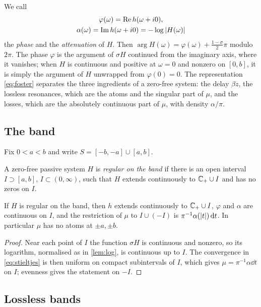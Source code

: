 We call
\begin{gather*}
\varphi(\omega)=\operatorname{Re} h(\omega+i0),\\
\alpha(\omega)=\operatorname{Im} h(\omega+i0)=-\log\left|H(\omega)\right|
\end{gather*}
the \emph{phase} and the \emph{attenuation} of $H$. Then $\arg H(\omega)
=\varphi(\omega)+\frac{1-\sigma}2\pi$ modulo $2\pi$. The phase $\varphi$ is the
argument of $\sigma H$ continued from the imaginary axis, where it vanishes;
when $H$ is continuous and positive at $\omega=0$ and nonzero on $[0,b]$, it
is simply the argument of $H$ unwrapped from $\varphi(0)=0$. The
representation \eqref{eq:foster} separates the three ingredients of a
zero-free system: the delay $\beta z$, the lossless resonances, which are the
atoms and the singular part of $\mu$, and the losses, which are the
absolutely continuous part of $\mu$, with density $\alpha/\pi$.

\subsection{The band}

Fix $0<a<b$ and write $S=[-b,-a]\cup[a,b]$.

\begin{definition}\label{def:band}
A zero-free passive system $H$ is \emph{regular on the band} if there is an
open interval $I\supset[a,b]$, $I\subset(0,\infty)$, such that $H$ extends
continuously to $\mathbb C_{+}\cup I$ and has no zeros on $I$.
\end{definition}

\begin{lemma}\label{lem:regular}
If $H$ is regular on the band, then $h$ extends continuously to $\mathbb C_{+}\cup I$,
$\varphi$ and $\alpha$ are continuous on $I$, and the restriction of $\mu$ to
$I\cup(-I)$ is $\pi^{-1}\alpha(\left|t\right|)\,\mathrm d t$. In particular $\mu$ has no
atoms at $\pm a,\pm b$.
\end{lemma}

\begin{proof}
Near each point of $I$ the function $\sigma H$ is continuous and nonzero, so
its logarithm, normalised as in \cref{lem:log}, is continuous up to $I$. The
convergence in \eqref{eq:stieltjes} is then uniform on compact subintervals
of $I$, which gives $\mu=\pi^{-1}\alpha\dd t$ on $I$; evenness gives the
statement on $-I$.
\end{proof}

\subsection{Lossless bands}

